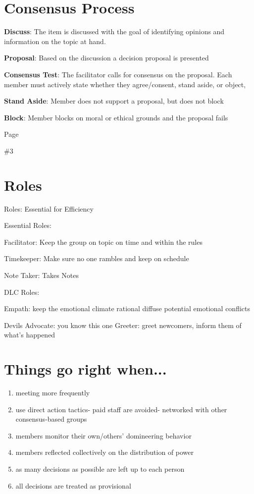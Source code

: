 \documentclass{article}
\begin{document}
	\begin{center}
	\end{center}
	 \newpage%
	 
	\section{Consensus Process}
	
	\textbf{Discuss}: The item is discussed with the goal of identifying opinions and information on the topic at hand.
	
	\textbf{Proposal}: Based on the discussion a decision proposal is presented
	
	\textbf{Consensus Test}: The facilitator calls for consensus on the proposal. Each member must actively state whether they agree/consent, stand aside, or object,
	
	\textbf{Stand Aside}: Member does not support a proposal, but does not block
	
	\textbf{Block}: Member blocks on moral or ethical grounds and the proposal fails
	
	\newpage
	
	Page\par \#3
	
	\newpage
	\section{Roles}
	Roles: Essential for      Efficiency
	
	Essential Roles:        
	
	Facilitator: Keep the group on topic on time and within the rules        
	
	Timekeeper: Make sure no one rambles and keep on schedule         
	
	 Note Taker: Takes Notes     
	 
	 DLC Roles:   
	 
	 Empath: keep the emotional climate rational diffuse potential emotional conflicts    
	 
	 Devils Advocate: you know this one    Greeter: greet newcomers, inform them of what's happened
	
	\newpage
	\section{Things go right when...}
	\begin{enumerate}
	\item meeting more frequently
	\item use direct action tactics- paid staff are avoided- networked with other  consensus-based groups
	\item members monitor their own/others’ domineering behavior
	\item members reflected collectively on the distribution of power
	\item as many decisions as possible are left up to each person
	\item all decisions are treated as provisional
	\end{enumerate}
	\newpage
\end{document}
